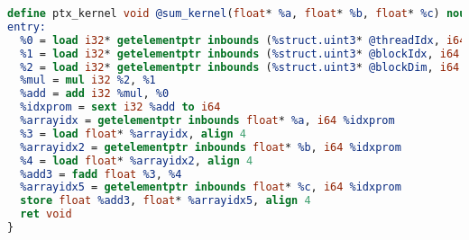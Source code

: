 \documentclass{article}
\begin{document}
\begin{lstlisting}[language=llvm]
define ptx_kernel void @sum_kernel(float* %a, float* %b, float* %c) nounwind {
entry:
  %0 = load i32* getelementptr inbounds (%struct.uint3* @threadIdx, i64 0, i32 0), align 4
  %1 = load i32* getelementptr inbounds (%struct.uint3* @blockIdx, i64 0, i32 0), align 4
  %2 = load i32* getelementptr inbounds (%struct.uint3* @blockDim, i64 0, i32 0), align 4
  %mul = mul i32 %2, %1
  %add = add i32 %mul, %0
  %idxprom = sext i32 %add to i64
  %arrayidx = getelementptr inbounds float* %a, i64 %idxprom
  %3 = load float* %arrayidx, align 4
  %arrayidx2 = getelementptr inbounds float* %b, i64 %idxprom
  %4 = load float* %arrayidx2, align 4
  %add3 = fadd float %3, %4
  %arrayidx5 = getelementptr inbounds float* %c, i64 %idxprom
  store float %add3, float* %arrayidx5, align 4
  ret void
}
\end{lstlisting}
\end{document}
